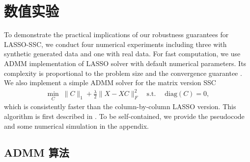 \documentclass[main.tex]{subfiles}
\begin{document}
\chapter{数值实验}\label{chp:experiments}

To demonstrate the practical implications of our robustness guarantees for LASSO-SSC, we conduct four numerical experiments including three with synthetic generated data and one with real data. For fast computation, we use ADMM implementation of LASSO solver
  with default numerical parameters. Its complexity is proportional to the problem size and the convergence guarantee \cite{boyd2011admm}. We also implement a simple ADMM solver for the matrix version SSC
\begin{align}\label{eq:MatrixLasso}
\min_{C} \; \|C\|_1+\frac{\lambda}{2}\|X-XC\|_F^2 \quad
\text{s.t.} \;\quad\mathrm{diag}(C)=0,
\end{align}
which is consistently faster than the column-by-column LASSO version. This algorithm is first described in \cite{elhamifar2012ssc_journal}. To be self-contained, we   provide the pseudocode and some numerical simulation in the appendix.
\section{ADMM 算法}
\end{document}
